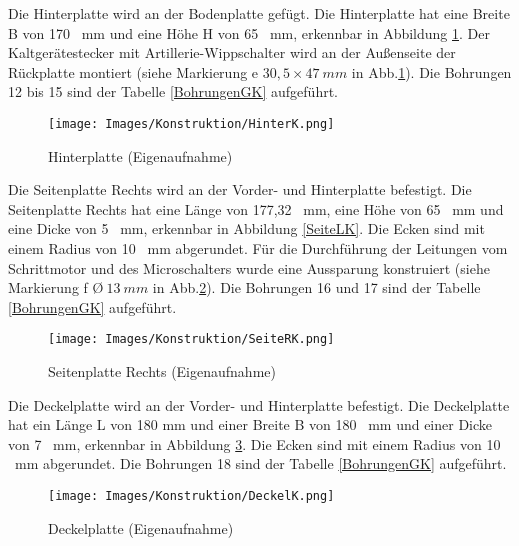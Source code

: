 Die Hinterplatte wird an der Bodenplatte gefügt. Die Hinterplatte hat eine Breite B von 170 \ mm und eine Höhe H von 65 \ mm, erkennbar in Abbildung \ref{HinterK}. Der Kaltgerätestecker mit Artillerie-Wippschalter wird an der Außenseite der Rückplatte montiert (siehe Markierung e $30,5 \times 47 \ mm$  in Abb.\ref{HinterK}). Die Bohrungen 12 bis 15 sind der Tabelle \ref{BohrungenGK} aufgeführt.

	\begin{figure}[H]
		\begin{center}
			\texttt{[image: Images/Konstruktion/HinterK.png]}
			\caption{Hinterplatte (Eigenaufnahme)} \label{HinterK}
		\end{center}
	\end{figure}

Die Seitenplatte Rechts wird an der Vorder- und Hinterplatte befestigt. Die Seitenplatte Rechts hat eine Länge von 177,32 \ mm, eine Höhe von 65 \ mm und eine Dicke von 5 \ mm, erkennbar in Abbildung \ref{SeiteLK}. Die Ecken sind mit einem Radius von 10 \ mm abgerundet. Für die Durchführung der Leitungen vom Schrittmotor und des Microschalters wurde eine Aussparung konstruiert (siehe Markierung f \O $ \ 13 \ mm$  in Abb.\ref{SeiteRK}). Die Bohrungen 16 und 17 sind der Tabelle \ref{BohrungenGK} aufgeführt. 


\begin{figure}[H]
	\begin{center}
		\texttt{[image: Images/Konstruktion/SeiteRK.png]}
		\caption{Seitenplatte Rechts (Eigenaufnahme)} \label{SeiteRK}
	\end{center}
\end{figure}

Die Deckelplatte wird an der Vorder- und Hinterplatte befestigt. Die Deckelplatte hat ein Länge L von 180 mm und einer Breite B von 180 \ mm und einer Dicke von 7 \ mm, erkennbar in Abbildung \ref{DeckelK}. Die Ecken sind mit einem Radius von 10 \ mm abgerundet. Die Bohrungen 18 sind der Tabelle \ref{BohrungenGK} aufgeführt.

	\begin{figure}[H]
		\begin{center}
			\texttt{[image: Images/Konstruktion/DeckelK.png]}
			\caption{Deckelplatte (Eigenaufnahme)} \label{DeckelK}
		\end{center}
	\end{figure}
	
